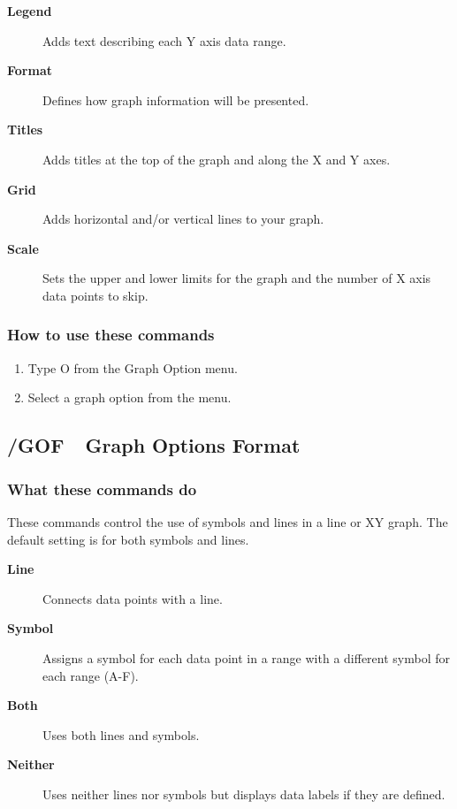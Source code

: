 \begin{description}
\item[{\bf Legend  }]{Adds text describing each Y axis data range.}
\item[{\bf Format  }]{Defines how graph information will be presented.}
\item[{\bf Titles  }]{Adds titles at the top of the graph and
        along the X and Y axes.}
\item[{\bf Grid}]{    Adds horizontal and/or vertical lines to
        your graph.}
\item[{\bf Scale   }]{Sets the upper and lower limits for the graph and
        the number of X axis data points to skip.}
\end{description}
        
\subsubsection*{How to use these commands}
\begin{enumerate}
\item{Type O from the Graph Option menu.}
\item{Select a graph option from the menu.}
\end{enumerate}
        
\subsection*{/GOF\ \     Graph Options Format}

\subsubsection*{What these commands do}
These commands control the use of symbols and lines in a line or XY 
graph.  The default setting is for both symbols and lines.
\begin{description}
\item[{\bf Line    }]{Connects data points with a line.}
\item[{\bf Symbol  }]{Assigns a symbol for each data point in a range
        with a different symbol for each range (A-F).}
\item[{\bf Both    }]{Uses both lines and symbols.}
\item[{\bf Neither }]{Uses neither lines nor symbols but displays data
        labels if they are defined.}
\end{description}
        
